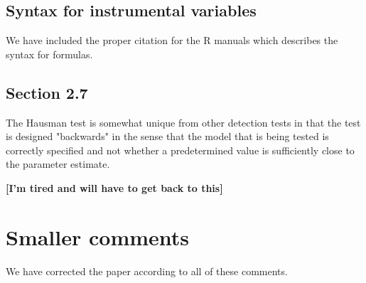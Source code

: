 \documentclass[12pt,english]{scrartcl}
\begin{document}
\subsection{Syntax for instrumental variables}

We have included the proper citation for the R manuals which describes
the syntax for formulas. 

\subsection{Section 2.7}

The Hausman test is somewhat unique from other detection tests in that
the test is designed "backwards" in the sense that the model that is
being tested is correctly specified and not whether a predetermined 
value is sufficiently close to the parameter estimate. 

\textbf{[I'm tired and will have to get back to this]}

\section{Smaller comments}
We have corrected the paper according to all of these comments.

% 
% 
\end{document}
